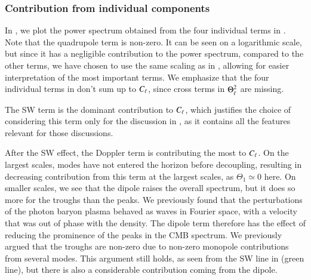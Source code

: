 \subsubsection{Contribution from individual components} \label{sssec:M4:results:contribution_from_individual_components}
In , we plot the power spectrum obtained from the four individual terms in . Note that the quadrupole term is non-zero. It can be seen on a logarithmic scale, but since it has a negligible contribution to the power spectrum, compared to the other terms, we have chosen to use the same scaling as in , allowing for easier interpretation of the most important terms. We emphasize that the four individual terms in  don't sum up to $C_\ell$, since cross terms in $\Theta_\ell^2$ are missing.    

The SW term is the dominant contribution to $C_\ell$, which justifies the choice of considering this term only for the discussion in , as it contains all the features relevant for those discussions. 

After the SW effect, the Doppler term is contributing the most to $C_\ell$. On the largest scales, modes have not entered the horizon before decoupling, resulting in decreasing contribution from this term at the largest scales, as $\Theta_1\simeq0$ here. On smaller scales, we see that the dipole raises the overall spectrum, but it does so more for the troughs than the peaks. We previously found that the perturbations of the photon baryon plasma behaved as waves in Fourier space, with a velocity that was out of phase with the density. The dipole term therefore has the effect of reducing the prominence of the peaks in the CMB spectrum. We previously argued that the troughs are non-zero due to non-zero monopole contributions from several modes. This argument still holds, as seen from the SW line in  (green line), but there is also a considerable contribution coming from the dipole. 

